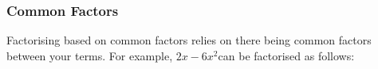             \subsubsection{ Common Factors}
            \nopagebreak
          \label{m39383*id268808}Factorising based on common factors relies on there being common factors between your terms. For example, $2x-6{x}^{2}$\hspace{1ex}can be factorised as follows:\par 
          \label{m39383*id268835}\nopagebreak\noindent{}
\label{m39383*secfhsst!!!underscore!!!id565}

